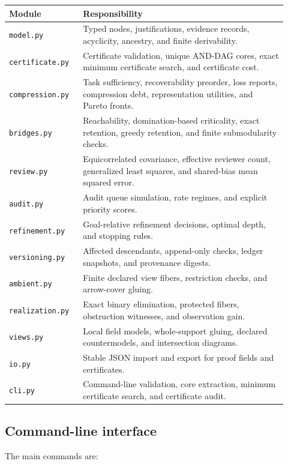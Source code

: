 \documentclass[11pt,oneside]{article}
\theoremstyle{definition}
\theoremstyle{remark}
\begin{document}
\begin{longtable}{@{}p{0.24\linewidth}p{0.68\linewidth}@{}}
\toprule
Module & Responsibility\\
\midrule
\endhead
\texttt{model.py} & Typed nodes, justifications, evidence records, acyclicity, ancestry, and finite derivability.\\
\texttt{certificate.py} & Certificate validation, unique AND-DAG cores, exact minimum certificate search, and certificate cost.\\
\texttt{compression.py} & Task sufficiency, recoverability preorder, loss reports, compression debt, representation utilities, and Pareto fronts.\\
\texttt{bridges.py} & Reachability, domination-based criticality, exact retention, greedy retention, and finite submodularity checks.\\
\texttt{review.py} & Equicorrelated covariance, effective reviewer count, generalized least squares, and shared-bias mean squared error.\\
\texttt{audit.py} & Audit queue simulation, rate regimes, and explicit priority scores.\\
\texttt{refinement.py} & Goal-relative refinement decisions, optimal depth, and stopping rules.\\
\texttt{versioning.py} & Affected descendants, append-only checks, ledger snapshots, and provenance digests.\\
\texttt{ambient.py} & Finite declared view fibers, restriction checks, and arrow-cover gluing.\\
\texttt{realization.py} & Exact binary elimination, protected fibers, obstruction witnesses, and observation gain.\\
\texttt{views.py} & Local field models, whole-support gluing, declared countermodels, and intersection diagrams.\\
\texttt{io.py} & Stable JSON import and export for proof fields and certificates.\\
\texttt{cli.py} & Command-line validation, core extraction, minimum certificate search, and certificate audit.\\
\bottomrule
\end{longtable}

\subsection{Command-line interface}

The main commands are:
\end{document}
